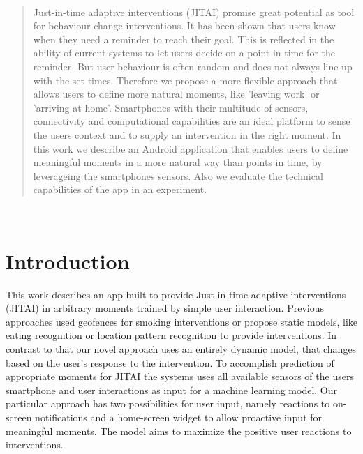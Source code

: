 \documentclass[a4paper]{report}
\begin{document}

\newpage \ \pagestyle{empty}
\newpage \pagestyle{empty}

\setcounter{tocdepth}{1}
\begin{abstract} 
Just-in-time adaptive interventions (JITAI) promise great potential as tool for behaviour change interventions. It has been shown that users know when they need a reminder to reach their goal. This is reflected in the ability of current systems to let users decide on a point in time for the reminder. But user behaviour is often random and does not always line up with the set times. Therefore we propose a more flexible approach that allows users to define more natural moments, like 'leaving work' or 'arriving at home'.
Smartphones with their multitude of sensors, connectivity and computational capabilities are an ideal platform to sense the users context and to supply an intervention in the right moment. In this work we describe an Android application that enables users to define meaningful moments in a more natural way than points in time, by leverageing the smartphones sensors. Also we evaluate the technical capabilities of the app in an experiment.
\end{abstract}
\newpage \
\newpage
 \pagestyle{plain}
 \tableofcontents\newpage

\chapter{Introduction}
This work describes an app built to provide Just-in-time adaptive interventions (JITAI) in arbitrary moments trained by simple user interaction. Previous approaches used geofences for smoking interventions \parencite{Naughton2016} or propose static models, like eating recognition \parencite{Rahman2016} or location pattern recognition \parencite{Wang2016} to provide interventions. In contrast to that our novel approach uses an entirely dynamic model, that changes based on the user's response to the intervention. To accomplish prediction of appropriate moments for JITAI the systems uses all available sensors of the users smartphone and user interactions as input for a machine learning model. Our particular approach has two possibilities for user input, namely reactions to on-screen notifications and a home-screen widget to allow proactive input for meaningful moments. The model aims to maximize the positive user reactions to interventions.
\end{document}
